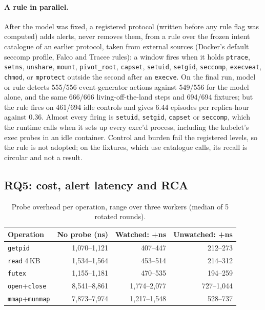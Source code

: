 \paragraph{A rule in parallel.} After the model was fixed, a registered protocol (written before any rule flag was
computed) adds alerts, never removes them, from a rule over the frozen intent catalogue of an earlier protocol, taken
from external sources (Docker's default seccomp profile, Falco and Tracee rules): a window fires when it holds
\texttt{ptrace}, \texttt{setns}, \texttt{unshare}, \texttt{mount}, \texttt{pivot\_root}, \texttt{capset},
\texttt{setuid}, \texttt{setgid}, \texttt{seccomp}, \texttt{execveat}, \texttt{chmod}, or \texttt{mprotect} outside the
second after an \texttt{execve}. On the final run, model or rule detects 555/556 event-generator actions against 549/556
for the model alone, and the same 666/666 living-off-the-land steps and 694/694 fixtures; but the rule fires on 461/694
idle controls and gives 6.44 episodes per replica-hour against 0.36. Almost every firing is \texttt{setuid},
\texttt{setgid}, \texttt{capset} or \texttt{seccomp}, which the runtime calls when it sets up every exec'd process,
including the kubelet's exec probes in an idle container. Control and burden fail the registered levels, so the rule is
not adopted; on the fixtures, which use catalogue calls, its recall is circular and not a result.

\subsection{RQ5: cost, alert latency and RCA}\label{sec:eval-cost}

\begin{table}[t]
\centering\small
\caption{Probe overhead per operation, range over three workers (median of 5 rotated rounds).}
\label{tab:overhead}
\begin{tabular}{@{}lrrr@{}}
\toprule
Operation & No probe (ns) & Watched: +ns & Unwatched: +ns \\
\midrule
\texttt{getpid} & 1{,}070--1{,}121 & 407--447 & 212--273 \\
\texttt{read} 4\,KB & 1{,}534--1{,}564 & 453--514 & 214--312 \\
\texttt{futex} & 1{,}155--1{,}181 & 470--535 & 194--259 \\
\texttt{open}+\texttt{close} & 8{,}541--8{,}861 & 1{,}774--2{,}077 & 727--1{,}044 \\
\texttt{mmap}+\texttt{munmap} & 7{,}873--7{,}974 & 1{,}217--1{,}548 & 528--737 \\
\bottomrule
\end{tabular}
\end{table}

